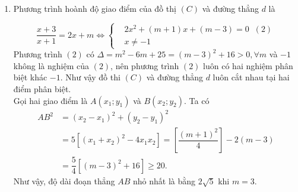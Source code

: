 \begin{vd}
{\begin{enumerate}
\begin{itemize}
\begin{center}
				\end{center}
			\end{itemize}
			\item 
			Phương trình hoành độ giao điểm của đồ thị $(C)$ và đường thẳng $d$ là
			
			$$ \dfrac{x+3}{x+1}=2x+m\Leftrightarrow 
			\left\{\begin{aligned}
			&2x^2+(m+1)x+(m-3)=0\;\; (2)\\ 
			&x\ne -1
			\end{aligned}\right. $$
			Phương trình $(2)$ có $\Delta = m^2-6m+25=(m-3)^2+16>0, \forall m$ và $-1$ không là nghiệm của $(2)$, nên phương trình $(2)$ luôn có hai nghiệm phân biệt khác $-1$. Như vậy đồ thi $(C)$ và đường thẳng $d$ luôn cắt nhau tại hai điểm phân biệt.\\
			Gọi hai giao điểm là $A(x_1;y_1)$ và $B(x_2;y_2)$. Ta có
			\begin{align*}
			AB^2 &= (x_2-x_1)^2+(y_2-y_1)^2\\
			&=5\left[(x_1+x_2)^2-4x_1x_2\right]=\left[\dfrac{(m+1)^2}{4}\right]-2(m-3)\\
			&=\dfrac{5}{4}\left[(m-3)^2+16\right]\ge 20.
			\end{align*}
			Như vậy, độ dài đoạn thẳng $AB$ nhỏ nhất là bằng $2\sqrt{5}$ khi $m=3$.
		\end{enumerate}
	}
\end{vd}

